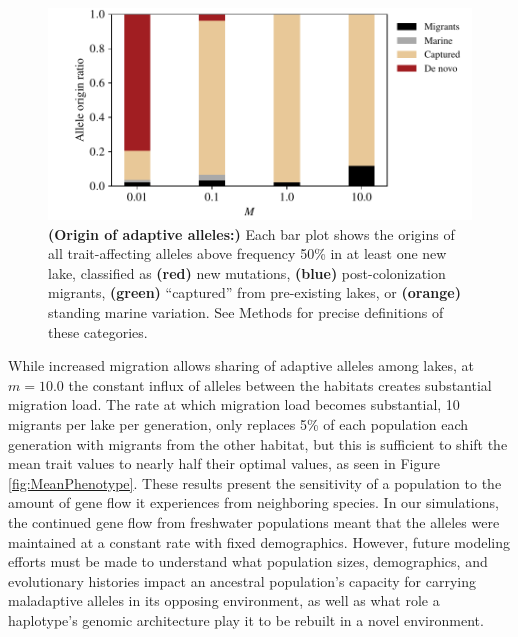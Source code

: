 \documentclass{article}
\begin{document}
\begin{figure}
    \begin{center}
    \includegraphics{Final_Plots/Allele_Origin_2.pdf}
    \caption{ 
        \textbf{(Origin of adaptive alleles:)}
        Each bar plot shows the origins
        of all trait-affecting alleles above frequency 50\% in at least one new lake,
        classified as
        \textbf{(red)} new mutations,
        \textbf{(blue)} post-colonization migrants,
        \textbf{(green)} ``captured'' from pre-existing lakes, or
        \textbf{(orange)} standing marine variation.
        See Methods for precise definitions of these categories.
    } \label{fig:Origin}
    \end{center}
\end{figure}

While increased migration allows sharing of adaptive alleles among lakes, at $m = 10.0$ the constant influx of alleles between the habitats creates substantial migration load. The rate at which migration load becomes substantial, 10 migrants per lake per generation, only replaces 5\% of each population each generation with migrants from the other habitat, but this is sufficient to shift the mean trait values to nearly half their optimal values, as seen in Figure \ref{fig:MeanPhenotype}. 
These results present the sensitivity of a population to the amount of gene flow it experiences from neighboring species.
In our simulations, the continued gene flow from freshwater populations meant that the alleles were maintained at a constant rate with fixed demographics. 
However, future modeling efforts must be made to understand what population sizes, demographics, and evolutionary histories impact an ancestral population's capacity for carrying maladaptive alleles in its opposing environment, as well as what role a haplotype's genomic architecture play it to be rebuilt in a novel environment.
\end{document}
